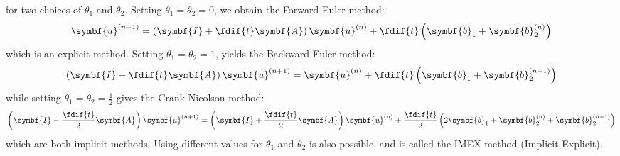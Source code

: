 \documentclass{article}
\begin{document}
for two choices of \(\theta_1\) and \(\theta_2\).
Setting \(\theta_1 = \theta_2 = 0\), we obtain the Forward Euler method:
\begin{equation*}
    \symbf{u}^{\left( n+1 \right)} = \left( \symbf{I} + \fdif{t} \symbf{A} \right) \symbf{u}^{\left( n \right)} + \fdif{t} \left( \symbf{b}_1 + \symbf{b}_2^{\left( n \right)} \right)
\end{equation*}
which is an explicit method. Setting \(\theta_1 = \theta_2 = 1\), yields
the Backward Euler method:
\begin{equation*}
    \left( \symbf{I} - \fdif{t} \symbf{A} \right) \symbf{u}^{\left( n+1 \right)} = \symbf{u}^{\left( n \right)} + \fdif{t} \left( \symbf{b}_1 + \symbf{b}_2^{\left( n+1 \right)} \right)
\end{equation*}
while setting \(\theta_1 = \theta_2 = \frac{1}{2}\) gives the Crank-Nicolson
method:
\begin{equation*}
    \left( \symbf{I} - \frac{\fdif{t}}{2} \symbf{A} \right) \symbf{u}^{\left( n+1 \right)} = \left( \symbf{I} + \frac{\fdif{t}}{2} \symbf{A} \right) \symbf{u}^{\left( n \right)} + \frac{\fdif{t}}{2} \left( 2 \symbf{b}_1 + \symbf{b}_2^{\left( n \right)} + \symbf{b}_2^{\left( n+1 \right)} \right)
\end{equation*}
which are both implicit methods. Using different values for \(\theta_1\)
and \(\theta_2\) is also possible, and is called the IMEX method (Implicit-Explicit).
\end{document}

